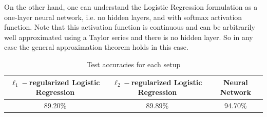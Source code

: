 \documentclass{article}
\begin{document}
On the other hand, one can understand the Logistic Regression formulation as a one-layer neural network, i.e. no hidden layers, and with softmax activation function. Note that this activation function is continuous and can be arbitrarily well approximated using a Taylor series and there is no hidden layer. So in any case the general approximation theorem holds in this case.

\begin{table}[ht]
    \centering
    \begin{tabular}{ccc}
        \toprule
        $\ell_1-$regularized Logistic Regression &  $\ell_2-$regularized Logistic Regression & Neural Network\\
        \midrule
        89.20\% & 89.89\% & 94.70\% \\
        \bottomrule
    \end{tabular}
    \caption{Test accuracies for each setup}
    \label{tab:acc}
\end{table}
\end{document}
